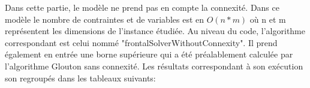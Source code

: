 \documentclass[a4paper, 11pt]{article} %
\begin{document}
Dans cette partie, le modèle ne prend pas en compte la connexité. Dans ce modèle le nombre de contraintes et de variables est en $O(n*m)$ où n et m représentent les dimensions de l'instance étudiée. Au niveau du code, l'algorithme correspondant est celui nommé "frontalSolverWithoutConnexity". Il prend également en entrée une borne supérieure qui a été préalablement calculée par l'algorithme Glouton sans connexité. Les résultats correspondant à son exécution son regroupés dans les tableaux suivants:
\begin{comment}
\begin{center}
\begin{figure}
   \begin{minipage}[c]{.46\linewidth}
      \begin{tabular}{|c|c|c|}
  		\hline 
  		Instance & Solution & Temps \\ \hline
  		$5\_8\_1$ &  &   \\ \hline 
  		$5\_8\_2$ &  &   \\ \hline 
  		$5\_8\_3$ &  &   \\ \hline 
  		$5\_8\_4$ &  &   \\ \hline 
  		$5\_8\_5$ &  &   \\ \hline 
  		$5\_8\_6$ &  &   \\ \hline 
  		$5\_8\_7$ &  &   \\ \hline 
  		$5\_8\_8$ &  &   \\ \hline 
  		$5\_8\_9$ &  &   \\ \hline 
  		$5\_8\_10$ &  &   \\ \hline 
  	  \end{tabular}
   \end{minipage} \hfill
   \begin{minipage}[c]{.46\linewidth}
      \begin{tabular}{|c|c|c|}
  		\hline 
  		Instance & Solution & Temps \\ \hline
  		$12\_10\_1$ &  &   \\ \hline
  		$12\_10\_2$ &  &   \\ \hline
  		$12\_10\_3$ &  &   \\ \hline
  		$12\_10\_4$ &  &   \\ \hline
  		$12\_10\_5$ &  &   \\ \hline
  		$12\_10\_6$ &  &   \\ \hline
  		$12\_10\_7$ &  &   \\ \hline
  		$12\_10\_8$ &  &   \\ \hline
  		$12\_10\_9$ &  &   \\ \hline
  		$12\_10\_10$ &  &   \\ \hline 
  	  \end{tabular}
   \end{minipage}
\end{figure}


\end{comment}
\end{document}
